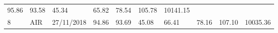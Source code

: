 \documentclass[
  11pt,
]{article}
\begin{document}
\begin{longtable}[]{@{}llllllllll@{}}
\begin{minipage}[t]{0.07\columnwidth}
95.86\strut
\end{minipage} & \begin{minipage}[t]{0.07\columnwidth}\raggedright
93.58\strut
\end{minipage} & \begin{minipage}[t]{0.07\columnwidth}\raggedright
45.34\strut
\end{minipage} & \begin{minipage}[t]{0.07\columnwidth}\raggedright
65.82\strut
\end{minipage} & \begin{minipage}[t]{0.07\columnwidth}\raggedright
78.54\strut
\end{minipage} & \begin{minipage}[t]{0.08\columnwidth}\raggedright
105.78\strut
\end{minipage} & \begin{minipage}[t]{0.09\columnwidth}\raggedright
10141.15\strut
\end{minipage}\tabularnewline
\begin{minipage}[t]{0.05\columnwidth}\raggedright
8\strut
\end{minipage} & \begin{minipage}[t]{0.07\columnwidth}\raggedright
AIR\strut
\end{minipage} & \begin{minipage}[t]{0.11\columnwidth}\raggedright
27/11/2018\strut
\end{minipage} & \begin{minipage}[t]{0.07\columnwidth}\raggedright
94.86\strut
\end{minipage} & \begin{minipage}[t]{0.07\columnwidth}\raggedright
93.69\strut
\end{minipage} & \begin{minipage}[t]{0.07\columnwidth}\raggedright
45.08\strut
\end{minipage} & \begin{minipage}[t]{0.07\columnwidth}\raggedright
66.41\strut
\end{minipage} & \begin{minipage}[t]{0.07\columnwidth}\raggedright
78.16\strut
\end{minipage} & \begin{minipage}[t]{0.08\columnwidth}\raggedright
107.10\strut
\end{minipage} & \begin{minipage}[t]{0.09\columnwidth}\raggedright
10035.36\strut
\end{minipage}\tabularnewline

\end{longtable}
\end{document}
